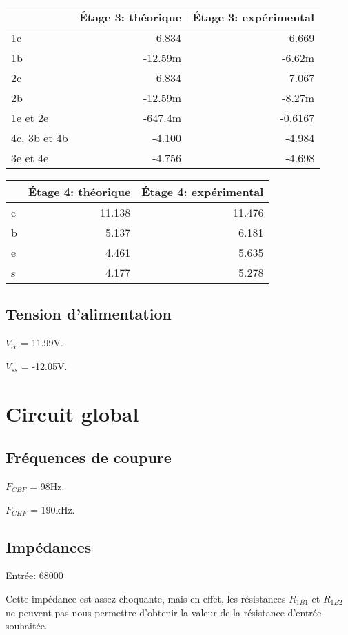 \begin{tabular}{|l|r|r|}
    \hline
    & Étage 3: théorique & Étage 3: expérimental \\
    \hline
    1c           &   6.834 &   6.669 \\
    \hline
    1b           & -12.59m &  -6.62m \\
    \hline
    2c           &   6.834 &   7.067 \\
    \hline
    2b           & -12.59m &  -8.27m \\
    \hline
    1e et 2e     & -647.4m & -0.6167 \\
    \hline
    4c, 3b et 4b &  -4.100 &  -4.984 \\
    \hline
    3e et 4e     &  -4.756 &  -4.698 \\
    \hline
\end{tabular}
\begin{tabular}{|l|r|r|}
    \hline
    & Étage 4: théorique & Étage 4: expérimental \\
    \hline
    c & 11.138 & 11.476 \\
    \hline
    b &  5.137 & 6.181 \\
    \hline
    e &  4.461 & 5.635 \\
    \hline
    s &  4.177 & 5.278 \\
    \hline
\end{tabular}

\subsection{Tension d’alimentation}
$V_{cc}$ = 11.99V.

$V_{ss}$ = -12.05V.

\section{Circuit global}

\subsection{Fréquences de coupure}
$F_{CBF}$ = 98Hz.

$F_{CHF}$ = 190kHz.

\subsection {Impédances}
Entrée: 68000\ohm

Cette impédance est assez choquante, mais en effet, les résistances $R_{1B1}$ et $R_{1B2}$ ne peuvent pas nous permettre d’obtenir la valeur de la résistance d’entrée souhaitée.

